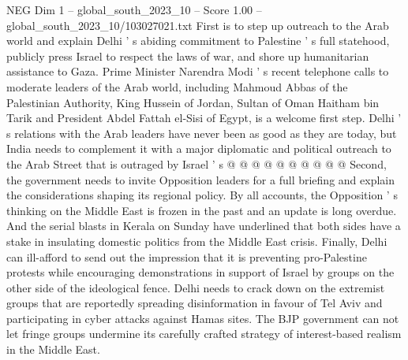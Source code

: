 \begin{textsample}{NEG Dim 1 – global\_south\_2023\_10 – Score 1.00 – global\_south\_2023\_10/103027021.txt}
First is to step up outreach to the Arab world and explain Delhi ' s abiding commitment to Palestine ' s full statehood, publicly press Israel to respect the laws of war, and shore up humanitarian assistance to Gaza.
Prime Minister Narendra Modi ' s recent telephone calls to moderate leaders of the Arab world, including Mahmoud Abbas of the Palestinian Authority, King Hussein of Jordan, Sultan of Oman Haitham bin Tarik and President Abdel Fattah el-Sisi of Egypt, is a welcome first step.
Delhi ' s relations with the Arab leaders have never been as good as they are today, but India needs to complement it with a major diplomatic and political outreach to the Arab Street that is outraged by Israel ' s @ @ @ @ @ @ @ @ @ @ Second, the government needs to invite Opposition leaders for a full briefing and explain the considerations shaping its regional policy.
By all accounts, the Opposition ' s thinking on the Middle East is frozen in the past and an update is long overdue.
And the serial blasts in Kerala on Sunday have underlined that both sides have a stake in insulating domestic politics from the Middle East crisis.
Finally, Delhi can ill-afford to send out the impression that it is preventing pro-Palestine protests while encouraging demonstrations in support of Israel by groups on the other side of the ideological fence.
Delhi needs to crack down on the extremist groups that are reportedly spreading disinformation in favour of Tel Aviv and participating in cyber attacks against Hamas sites.
The BJP government can not let fringe groups undermine its carefully crafted strategy of interest-based realism in the Middle East.

\end{textsample}
